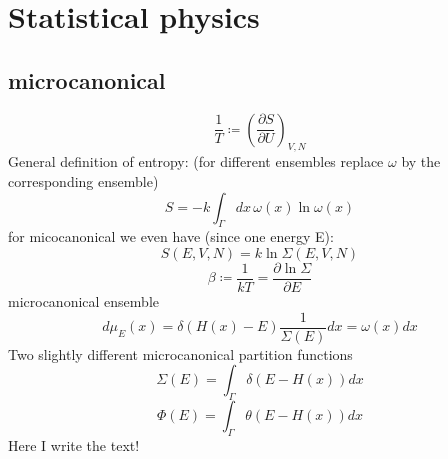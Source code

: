 \section{Statistical physics}
\subsection{microcanonical}
\begin{equation}
	\frac{1}{T} \coloneqq \left ( \frac{\partial S}{\partial U}\right)_{V,N}
\end{equation}
General definition of entropy: (for different ensembles replace $\omega$ by the corresponding ensemble)
\begin{equation}
	S = -k \int_\Gamma dx \, \omega (x) \ln \omega (x)
\end{equation}
for micocanonical we even have (since one energy E):
\begin{equation}
	S(E,V,N) = k \ln \Sigma(E,V,N)
\end{equation}
\begin{equation}
	\beta \coloneqq \frac{1}{kT} =  \frac{\partial \ln \Sigma}{\partial E}
\end{equation}
microcanonical ensemble
\begin{equation}
	d\mu_E (x) = \delta(H(x)-E) \frac{1}{\Sigma(E)} dx = \omega(x) dx
\end{equation}
Two slightly different microcanonical partition functions
\begin{equation}
	\Sigma(E) = \int_\Gamma \delta(E-H(x)) dx
\end{equation}
\begin{equation}
	\Phi(E) = \int_\Gamma \theta(E-H(x)) dx
\end{equation}
Here I write the text!